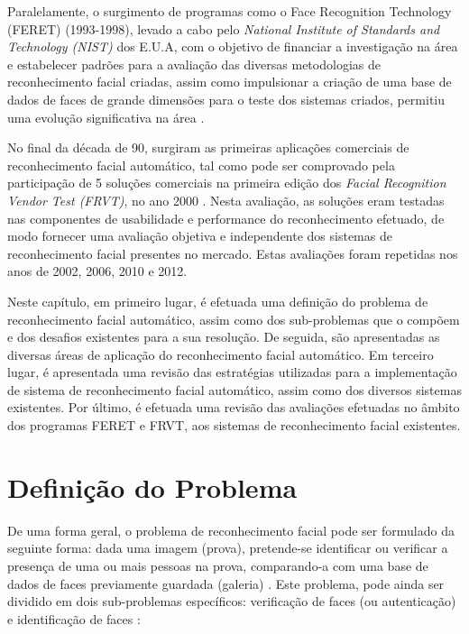 Paralelamente, o surgimento de programas como o Face Recognition Technology (FERET) (1993-1998), levado a cabo pelo \textit{National Institute of Standards and Technology (NIST)} dos E.U.A, com o objetivo de financiar a investigação na área e estabelecer padrões para a avaliação das diversas metodologias de reconhecimento facial criadas, assim como impulsionar a criação de uma base de dados de faces de grande dimensões para o teste dos sistemas criados, permitiu uma evolução significativa na área \citep{Phillips1998, Phillips2000}.

No final da década de 90, surgiram as primeiras aplicações comerciais de reconhecimento facial automático, tal como pode ser comprovado  pela participação de 5 soluções comerciais na primeira edição dos \textit{Facial Recognition Vendor Test (FRVT)}, no ano 2000 \citep{BlackburnDuaneM.;BoneMike;Phillips2001}. Nesta avaliação, as soluções eram testadas nas componentes de usabilidade e performance do reconhecimento efetuado, de modo fornecer uma avaliação objetiva e independente dos sistemas de reconhecimento facial presentes no mercado. Estas avaliações foram repetidas nos anos de 2002, 2006, 2010 e 2012.

Neste capítulo, em primeiro lugar, é efetuada uma definição do problema de reconhecimento facial automático, assim como dos sub-problemas que o compõem e dos desafios existentes para a sua resolução. De seguida, são apresentadas as diversas áreas de aplicação do reconhecimento facial automático. Em terceiro lugar, é apresentada uma revisão das estratégias utilizadas para a implementação de sistema de reconhecimento facial automático, assim como dos diversos sistemas existentes. Por último, é efetuada uma revisão das avaliações efetuadas no âmbito dos programas FERET e FRVT, aos sistemas de reconhecimento facial existentes.

\section{Definição do Problema} \label{sec:problema}
De uma forma geral, o problema de reconhecimento facial pode ser formulado da seguinte forma: dada uma imagem (prova), pretende-se identificar ou verificar a presença de uma ou mais pessoas na prova, comparando-a com uma base de dados de faces previamente guardada (galeria) \citep{Yang2002, Zhao2003}. Este problema, pode ainda ser dividido em dois sub-problemas específicos: verificação de faces (ou autenticação) e identificação de faces \citep{Li2011}:

